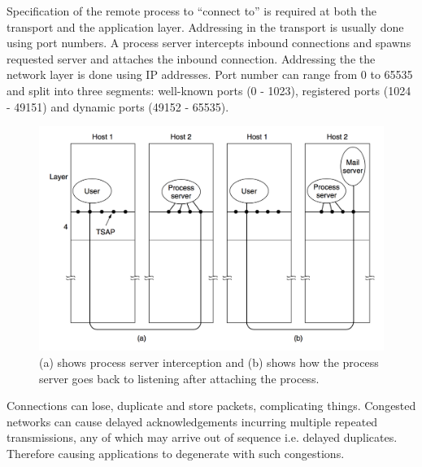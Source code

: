 \documentclass[twoside]{article}
\begin{document}
Specification of the remote process to ``connect to'' is required at both the
transport and the application layer. Addressing in the transport is usually 
done using port numbers. A process server intercepts inbound connections and 
spawns requested server and attaches the inbound connection. Addressing the
the network layer is done using IP addresses. Port number can range from 0 
to 65535 and split into three segments: well-known ports (0 - 1023), registered
ports (1024 - 49151) and dynamic ports (49152 - 65535).
\begin{figure}
  \includegraphics[width=\linewidth]{process-server.png}
  \caption{(a) shows process server interception and (b) shows how the process
  server goes back to listening after attaching the process.}
  \label{fig:process-server}
\end{figure}
Connections can lose, duplicate and store packets, complicating things. 
Congested networks can cause delayed acknowledgements incurring multiple 
repeated transmissions, any of which may arrive out of sequence i.e. delayed
duplicates. Therefore causing applications to degenerate with such congestions.
\end{document}
